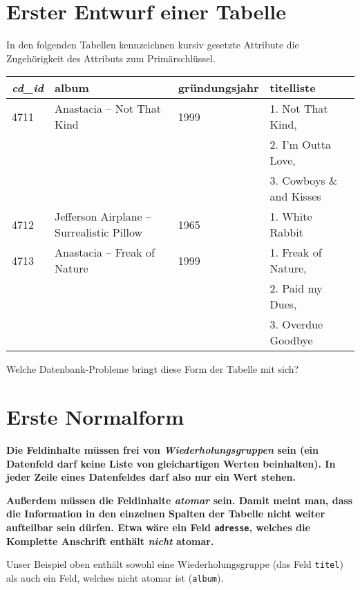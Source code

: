 \section{Erster Entwurf einer Tabelle}

In den folgenden Tabellen kennzeichnen kursiv gesetzte Attribute die
Zugehörigkeit des Attributs zum Primärschlüssel.

\begin{center}
\begin{tabular}{|l|l|l|l|}
\hline
\textbf{\em cd\_id} & \textbf{album} & \textbf{gründungsjahr} &
\textbf{titelliste} \\ \hline
4711 & Anastacia -- Not That Kind & 1999 & 1. Not That Kind, 
\\
& & & 2. I'm Outta Love, \\
& & & 3. Cowboys \& and Kisses \\ \hline 
4712 & Jefferson Airplane -- Surrealistic Pillow & 1965 & 1. White Rabbit \\
\hline
4713 & Anastacia -- Freak of Nature & 1999 & 1. Freak of Nature, \\
& & &  2. Paid my Dues, \\
& & & 3. Overdue Goodbye \\ \hline
\end{tabular}
\end{center}

Welche Datenbank-Probleme bringt diese Form der Tabelle mit sich?


\section{Erste Normalform}

\textbf{Die Feldinhalte müssen frei von \emph{Wiederholungsgruppen} sein (ein
Datenfeld darf keine Liste von gleichartigen Werten beinhalten).
In jeder Zeile eines Datenfeldes darf also nur ein Wert stehen.}

\textbf{Außerdem müssen die Feldinhalte \emph{atomar} sein. Damit meint man,
dass die Information in den einzelnen Spalten der Tabelle nicht weiter
aufteilbar sein dürfen. Etwa wäre ein Feld \lstinline|adresse|, welches die
Komplette Anschrift enthält \emph{nicht} atomar.}

Unser Beispiel oben enthält sowohl eine Wiederholungsgruppe (das Feld
\lstinline|titel|) als auch ein Feld, welches nicht atomar ist
(\lstinline|album|).

